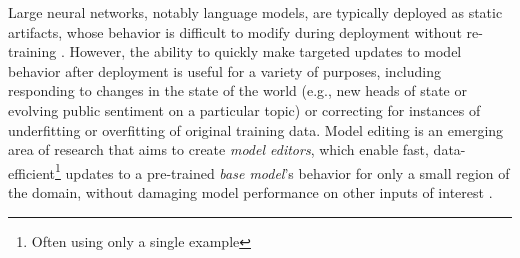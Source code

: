 



Large neural networks, notably language models, are typically deployed as static artifacts, whose behavior is difficult to modify during deployment without re-training \citep{lazaridou2021mind}.
However, the ability to quickly make targeted updates to model behavior after deployment is useful for a variety of purposes, including responding to changes in the state of the world (e.g., new heads of state or evolving public sentiment on a particular topic) or correcting for instances of underfitting or overfitting of original training data.
Model editing is an emerging area of research that aims to create \textit{model editors},
which enable fast, data-efficient\footnote{Often using only a single example}
updates to a pre-trained \textit{base model}'s behavior for only a small region of the domain, without damaging model performance on other inputs of interest \citep{Sinitsin2020Editable,zhu2020modifying,sotoudeh2019correcting,Cao2021EditingFK,dai2021knowledge,mitchell2021fast,hase2021language,anon2021moving}.

